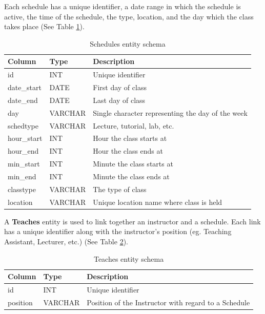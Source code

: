 \documentclass[12pt,letterpaper,oneside,notitlepage]{report}
\theoremstyle{definition}
\begin{document}
      Each schedule has a unique identifier, a date range in which the schedule is active, the time of the schedule, the type, location, and the day which the class takes place (See Table \ref{tbl:schedules-entity-schema}).
      
      \begin{table}[!htp]
        \centering
        \begin{tabular}{lll}
          \toprule
          Column & Type & Description \\
          \midrule
          id & INT & Unique identifier \\
          date\_start & DATE & First day of class \\
          date\_end & DATE & Last day of class \\
          day & VARCHAR & Single character representing the day of the week \\
          schedtype & VARCHAR & Lecture, tutorial, lab, etc. \\
          hour\_start & INT & Hour the class starts at \\
          hour\_end & INT & Hour the class ends at \\
          min\_start & INT & Minute the class starts at \\
          min\_end & INT & Minute the class ends at \\
          classtype & VARCHAR & The type of class \\
          location & VARCHAR & Unique location name where class is held \\
          \bottomrule
        \end{tabular}
        \caption{Schedules entity schema}
        \label{tbl:schedules-entity-schema}
      \end{table}
      
      A \textbf{Teaches} entity is used to link together an instructor and a schedule.  Each link has a unique identifier along with the instructor's position (eg. Teaching Assistant, Lecturer, etc.) (See Table \ref{tbl:teaches-entity-schema}).
      
      \begin{table}[!htp]
        \centering
        \begin{tabular}{lll}
          \toprule
          Column & Type & Description \\
          \midrule
          id & INT & Unique identifier \\
          position & VARCHAR & Position of the Instructor with regard to a Schedule \\
          \bottomrule
        \end{tabular}
        \caption{Teaches entity schema}
        \label{tbl:teaches-entity-schema}
      \end{table}
    
\end{document}
